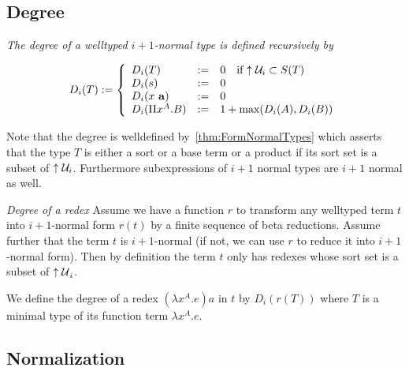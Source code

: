 \subsection{Degree}

\begin{definition}
    \label{def:TypeDegree}
    \emph{The degree of a welltyped $i+1$-normal type is defined recursively by}

    $$
    D_i(T) :=
    \dcases{
        D_i(T) &:=& 0 \quad\text{if } \upper{\Any_i} \subset S(T)
        \\
        D_i(s) &:=& 0
        \\
        D_i(x \vec a) &:=& 0
        \\
        D_i(\Pi x^A.B) &:=&
        1 + \text{max}(D_i(A), D_i(B))
    }
    $$

    Note that the degree is welldefined by~\ref{thm:FormNormalTypes} which
    asserts that the type $T$ is either a sort or a base term or a product if
    its sort set is a subset of ${\uparrow {\cal U}_i}$.
    Furthermore subexpressions of $i+1$ normal types are $i+1$ normal as well.
\end{definition}



\begin{definition}
    \label{def:RedexDegree}
    \emph{Degree of a redex} Assume we have a function $r$ to transform any
    welltyped term $t$ into $i+1$-normal form $r(t)$ by a finite sequence of
    beta reductions. Assume further that the term $t$ is $i+1$-normal (if not,
    we can use $r$ to reduce it into $i+1$-normal form). Then by definition the
    term $t$ only has redexes whose sort set is a subset of ${\uparrow {\cal U}}_i$.

    We define the degree of a redex $(\lambda x^A.e)a$ in $t$ by $D_i(r(T))$
    where $T$ is a minimal type of its function term $\lambda x^A.e$.
\end{definition}







\subsection{Normalization}


